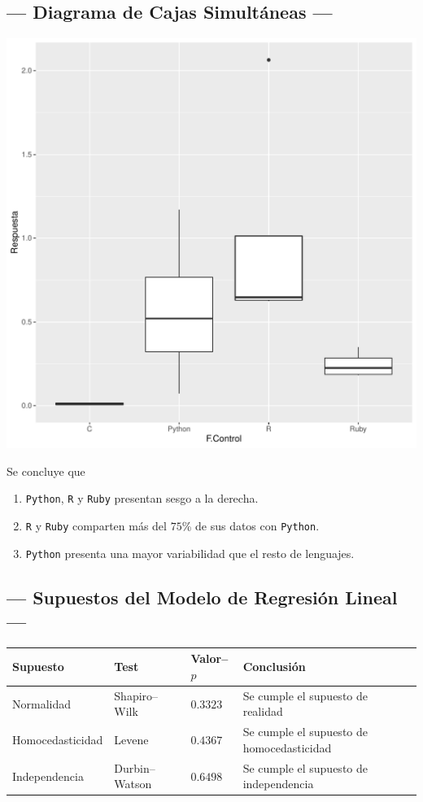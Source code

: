 \documentclass[11pt,a4paper]{article}
\begin{document}
\subsection{--- Diagrama de Cajas Simultáneas ---} %
\label{sub:cajas}
\begin{minipage}{0.65\linewidth}
	\includegraphics[width= 0.9 \linewidth, page = 1]{IMAGENES/9/RPlots.pdf}
\end{minipage}
\begin{minipage}{0.35\linewidth}
	Se concluye que
	\begin{enumerate}
		\item \texttt{Python}, \texttt{R} y \texttt{Ruby} presentan sesgo a la derecha.
		\item \texttt{R}  y \texttt{Ruby} comparten más del \(75\)\textsc{\%} de sus datos con \texttt{Python}.
		\item \texttt{Python} presenta una mayor variabilidad que el resto de lenguajes.
	\end{enumerate}
\end{minipage}

\subsection{--- Supuestos del Modelo de Regresión Lineal ---} %
\label{sub:supuestos_modelo}
\begin{table}[hbt!]
	\centering
	\begin{tabular}{|*{4}{l|}}
		\hline 
		Supuesto & Test & Valor--\(p\) & Conclusión \\ \hline
		Normalidad & Shapiro--Wilk & \(0.3323\) & Se cumple el supuesto de realidad \\ \hline
		Homocedasticidad & Levene & \(0.4367\) & Se cumple el supuesto de homocedasticidad \\ \hline
		Independencia & Durbin--Watson & \(0.6498\) & Se cumple el supuesto de independencia \\ \hline
	\end{tabular}
	\label{tab:supuestos}
\end{table}
\end{document}
